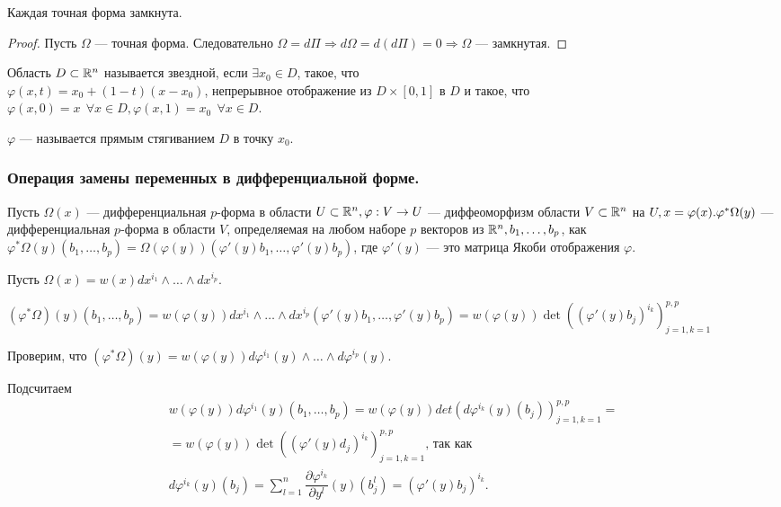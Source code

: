 \begin{corollary}
	Каждая точная форма замкнута. 
\end{corollary}

\begin{proof}
	Пусть $\Omega$ --- точная форма. Следовательно $\Omega=d\Pi\Rightarrow d\Omega=d(d\Pi)=0\Rightarrow\Omega$ --- замкнутая.
\end{proof}

\begin{Def}
	Область $D\subset\R^n$ называется звездной, если $\exists x_0\in D$, такое, что \\$ \varphi(x, t)=x_0+(1-t)(x-x_0)$, непрерывное отображение из $D\times[0,1]$ в $D$ и такое, что $\varphi(x,0)=x\ \ \forall x\in D, \varphi(x,1)=x_0\ \ \forall x\in D.$
	
	$\varphi$ --- называется прямым стягиванием $D$ в точку $x_0$.
\end{Def}

\subsubsection{Операция замены переменных в дифференциальной форме.}
\begin{Def}
	Пусть $\Omega(x)$ --- дифференциальная $p$-форма в области $U\subset\R^n, \varphi:V\to U$ --- диффеоморфизм области $V\subset\R^n$ на $U, x=\varphi(x).
	\\ \varphi^*\Omega(y)$ --- дифференциальная $p$-форма в области $V$, определяемая на любом наборе $p$ векторов из $\mathbb{R}^n, b_1,\ldots, b_p$, как  $\varphi^*\Omega(y)(b_1, \ldots, b_p)=\Omega(\varphi(y))(\varphi'(y)b_1, \ldots, \varphi'(y)b_p)$, где $\varphi'(y)$ --- это матрица Якоби отображения $\varphi$.
\end{Def} 

Пусть $\Omega(x)=w(x)dx^{i_1}\wedge\ldots\wedge dx^{i_p}$.

$(\varphi^*\Omega)(y)(b_1,\ldots, b_p)=w(\varphi(y))dx^{i_1}\wedge\ldots\wedge dx^{i_p}(\varphi'(y)b_1,\ldots, \varphi'(y)b_p)=w(\varphi(y))\det((\varphi'(y)b_j)^{i_k})_{j=1,k=1}^{p,p}$

Проверим, что $(\varphi^*\Omega)(y)=w(\varphi(y))d\varphi^{i_1}(y)\wedge\ldots\wedge d\varphi^{i_p}(y)$.

Подсчитаем 
\begin{multline*}
	w(\varphi(y))d\varphi^{i_1}(y)(b_1, \ldots, b_p)=w(\varphi(y))det(d\varphi^{i_k}(y)(b_j))_{j=1,k=1}^{p,p}=\\=w(\varphi(y))\det((\varphi'(y)d_j)^{i_k})_{j=1,k=1}^{p,p}\text{, так как }\\d\varphi^{i_k}(y)(b_j) = \sum\limits_{l=1}^n\dfrac{\partial \varphi^{i_k}}{\partial y^l}(y)(b_j^l)=(\varphi'(y)b_j)^{i_k}.
\end{multline*}

